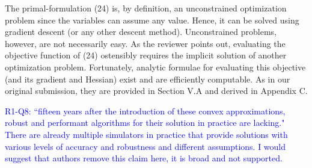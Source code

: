 The primal-formulation (24) is, by definition, an unconstrained optimization
problem since the variables can assume any value. Hence, it can be solved using
gradient descent (or any other descent method). Unconstrained problems, however,
are not necessarily easy. As the reviewer points out, evaluating the objective
function of (24) ostensibly requires the implicit solution of another
optimization problem. Fortunately, analytic formulae for evaluating this
objective (and its gradient and Hessian) exist and are efficiently computable.
As in our original submission, they are provided  in Section V.A and derived in
Appendix C.
\vspace{5mm}

\textcolor{blue}{R1-Q8: ``fifteen years after the introduction of these convex
approximations, robust and performant algorithms for their solution in practice
are lacking." There are already multiple simulators in practice that provide
solutions with various levels of accuracy and robustness and different
assumptions. I would suggest that authors remove this claim here, it is broad
and not supported.}

